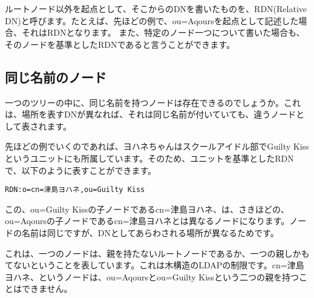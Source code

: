 ルートノード以外を起点として、そこからのDNを書いたものを、RDN(Relative DN)と呼びます。たとえば、先ほどの例で、ou=Aqoursを起点として記述した場合、それはRDNとなります。
また、特定のノード一つについて書いた場合も、そのノードを基準としたRDNであると言うことができます。

\subsection{同じ名前のノード}

一つのツリーの中に、同じ名前を持つノードは存在できるのでしょうか。これは、場所を表すDNが異なれば、それは同じ名前が付いていても、違うノードとして表されます。

先ほどの例でいくのであれば、ヨハネちゃんはスクールアイドル部でGuilty Kissというユニットにも所属しています。そのため、ユニットを基準としたRDNで、以下のように表すことができます。

\begin{verbatim}
RDN:o=cn=津島ヨハネ,ou=Guilty Kiss
\end{verbatim}

この、ou=Guilty Kissの子ノードであるcn=津島ヨハネ、は、さきほどの、ou=Aqoursの子ノードであるcn=津島ヨハネとは異なるノードになります。ノードの名前は同じですが、DNとしてあらわされる場所が異なるためです。

これは、一つのノードは、親を持たないルートノードであるか、一つの親しかもてないということを表しています。これは木構造のLDAPの制限です。cn=津島ヨハネ、というノードは、ou=Aqoursとou=Guilty Kissという二つの親を持つことはできません。

